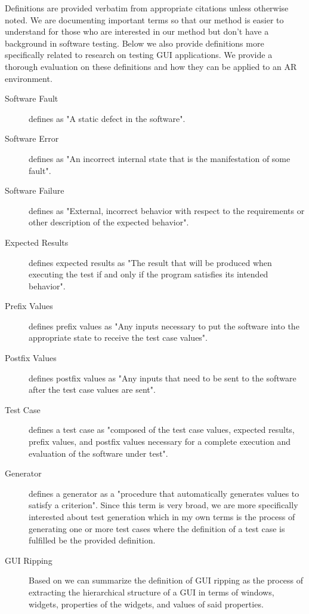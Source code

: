 \documentclass[final,3p]{CSP}
\begin{document}
Definitions are provided verbatim from appropriate citations unless otherwise noted.  We are documenting important terms so that our method is easier to understand for those who are interested in our method but don't have a background in software testing.  Below we also provide definitions more specifically related to research on testing GUI applications.  We provide a thorough evaluation on these definitions and how they can be applied to an AR environment.

\begin{description}
\item[Software Fault] \cite{intrototesting} defines as "A static defect in the software".
\item[Software Error] \cite{intrototesting} defines as "An incorrect internal state that is the manifestation of some fault".
\item[Software Failure] \cite{intrototesting} defines as "External, incorrect behavior with respect to the requirements or other description of the expected behavior".
\item[Expected Results] \cite{intrototesting} defines expected results as "The result that will be produced when executing the test if and only if the program satisfies its intended behavior".
\item[Prefix Values] \cite{intrototesting} defines prefix values as "Any inputs necessary to put the software into
the appropriate state to receive the test case values". 
\item[Postfix Values] \cite{intrototesting} defines postfix values as "Any inputs that need to be sent to the software after the test case values are sent".
\item[Test Case] \cite{intrototesting} defines a test case as "composed of the test case values,
expected results, prefix values, and postfix values necessary for a complete execution and evaluation of the software under test".
\item[Generator] \cite{intrototesting} defines a generator as a "procedure that automatically generates values to satisfy a criterion".  Since this term is very broad, we are more specifically interested about test generation which in my own terms is the process of generating one or more test cases where the definition of a test case is fulfilled be the provided definition.
\item[GUI Ripping] Based on \cite{GUIRip} we can summarize the definition of GUI ripping as the process of extracting the hierarchical structure of a GUI in terms of windows, widgets, properties of the widgets, and values of said properties.

\end{description}
\end{document}
